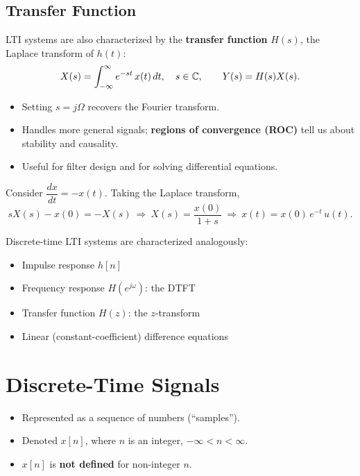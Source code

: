 \documentclass[handout_subfiles_root.tex]{subfiles}
\begin{document}
\subsection{Transfer Function}

LTI systems are also characterized by the \textbf{transfer function} $H(s)$,
the Laplace transform of $h(t)$:
$$X(s) = \int_{-\infty}^{\infty} e^{-st}\,x(t)\,dt, \quad s\in\mathbb{C}, \qquad
  Y(s) = H(s)X(s).$$

\begin{itemize}
  \item Setting $s = j\Omega$ recovers the Fourier transform.
  \item Handles more general signals; \textbf{regions of convergence (ROC)}
  tell us about stability and causality.
  \item Useful for filter design and for solving differential equations.
\end{itemize}

\begin{examplebox}[title={Example (Solving a Differential Equation with the Laplace Transform)}]
Consider $\dfrac{dx}{dt} = -x(t)$. Taking the Laplace transform,
$$sX(s) - x(0) = -X(s) \ \Longrightarrow\ X(s) = \frac{x(0)}{1+s}
  \ \Longrightarrow\ x(t) = x(0)\,e^{-t}\,u(t).$$
\end{examplebox}


Discrete-time LTI systems are characterized analogously:
\begin{itemize}
  \item Impulse response $h[n]$
  \item Frequency response $H(e^{j\omega})$: the DTFT
  \item Transfer function $H(z)$: the $z$-transform
  \item Linear (constant-coefficient) difference equations
\end{itemize}

\section{Discrete-Time Signals}

\begin{itemize}
  \item Represented as a sequence of numbers (``samples'').
  \item Denoted $x[n]$, where $n$ is an integer, $-\infty < n < \infty$.
  \item $x[n]$ is \textbf{not defined} for non-integer $n$.
\end{itemize}
\end{document}
